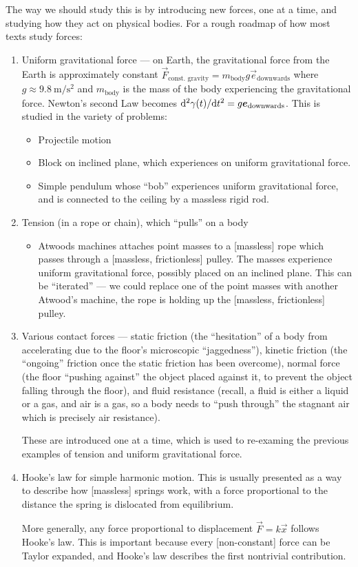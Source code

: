 The way we should study this is by introducing new forces, one at a
time, and studying how they act on physical bodies. For a rough roadmap
of how most texts study forces:
\begin{enumerate}[label=(\arabic*)]
\item Uniform gravitational force --- on Earth, the gravitational force
  from the Earth is approximately constant $\vec{F}_{\text{const.~gravity}}=m_{\text{body}}g\vec{e}_{\text{downwards}}$
  where $g\approx 9.8~\mathrm{m}/\mathrm{s}^{2}$ and $m_{\text{body}}$
  is the mass of the body experiencing the gravitational force. Newton's
  second Law becomes $\mathrm{d}^{2}\gamma(t)/\mathrm{d} t^{2}=g\boldsymbol{e}_{\text{downwards}}$.
  This is studied in the variety of problems:
  \begin{itemize}
  \item Projectile motion
  \item Block on inclined plane, which experiences on uniform
    gravitational force.
  \item Simple pendulum whose ``bob'' experiences uniform gravitational
    force, and is connected to the ceiling by a massless rigid rod.
  \end{itemize}
\item Tension (in a rope or chain), which ``pulls'' on a body
  \begin{itemize}
  \item Atwoods machines attaches point masses to a [massless] rope
    which passes through a [massless, frictionless] pulley. The masses
    experience uniform gravitational force, possibly placed on an
    inclined plane. This can be ``iterated'' --- we could replace one of
    the point masses with another Atwood's machine, the rope is holding
    up the [massless, frictionless] pulley.
  \end{itemize}
\item Various contact forces --- static friction (the
  ``hesitation'' of a body from accelerating due to the floor's
  microscopic ``jaggedness''), kinetic friction (the ``ongoing'' friction once the
  static friction has been overcome), normal force (the floor ``pushing
  against'' the object placed against it, to prevent the object falling
  through the floor), and fluid resistance (recall, a fluid is either a
  liquid or a gas, and air is a gas, so a body needs to ``push through''
  the stagnant air which is precisely air resistance).

  These are introduced one at a time, which is used to re-examing the
  previous examples of tension and uniform gravitational force.
\item Hooke's law for simple harmonic motion. This is usually presented
  as a way to describe how [massless] springs work, with a force
  proportional to the distance the spring is dislocated from
  equilibrium.

  More generally, any force proportional to displacement
  $\vec{F}=k\vec{x}$ follows Hooke's law. This is important because
  every [non-constant] force can be Taylor expanded, and Hooke's law
  describes the first nontrivial contribution.
\end{enumerate}
